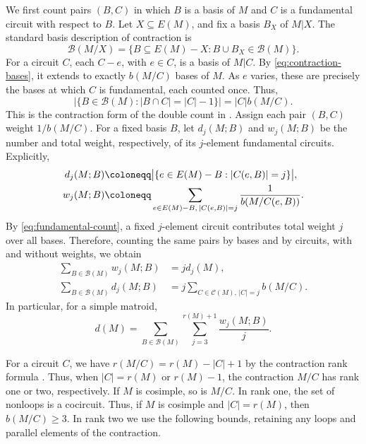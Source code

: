 \documentclass[11pt]{article}
\numberwithin{equation}{section}
\newcommand{\BB}{\mathcal B}
\newcommand{\CC}{\mathcal C}
\newcommand{\wloc}[1]{w_{#1}(M;B)}
\newcommand{\dloc}[1]{d_{#1}(M;B)}
\begin{document}
We first count pairs \((B,C)\) in which \(B\) is a basis of
\(M\) and \(C\) is a fundamental circuit with respect to \(B\).
Let \(X\subseteq E(M)\), and fix a basis \(B_X\) of \(M|X\).
The standard basis description of contraction
\cite[Corollary~3.1.8]{Oxley2011} is
\begin{equation}\label{eq:contraction-bases}
 \BB(M/X)=\{B\subseteq E(M)-X:B\cup B_X\in\BB(M)\}.
\end{equation}
For a circuit \(C\), each \(C-e\), with \(e\in C\), is a basis
of \(M|C\). By \eqref{eq:contraction-bases}, it extends to
exactly \(b(M/C)\) bases of \(M\). As \(e\) varies, these are
precisely the bases at which \(C\) is fundamental, each counted once.
Thus,
\begin{equation}\label{eq:fundamental-count}
 \bigl|\{B\in\BB(M):|B\cap C|=|C|-1\}\bigr|=|C|b(M/C).
\end{equation}
This is the contraction form of the double count in
\cite[proof of Theorem~1.1]{Oxley1983}.
Assign each pair \((B,C)\) weight \(1/b(M/C)\).
For a fixed basis \(B\), let \(\dloc{j}\) and \(\wloc{j}\)
be the number and total weight, respectively, of its
\(j\)-element fundamental circuits.
Explicitly,
\begin{align}
 \dloc{j}&\coloneqq\bigl|\{e\in E(M)-B:|C(e,B)|=j\}\bigr|,
 \notag\\
 \wloc{j}&\coloneqq\sum_{e\in E(M)-B,\,|C(e,B)|=j}
 \frac1{b(M/C(e,B))}.
 \label{eq:local-weight}
\end{align}
By \eqref{eq:fundamental-count}, a fixed \(j\)-element circuit
contributes total weight \(j\) over all bases.
Therefore, counting the same pairs by bases and by circuits,
with and without weights, we obtain
\begin{align}
 \sum_{B\in\BB(M)}\wloc{j}&=j d_j(M),
 \label{eq:weight-total}\\
 \sum_{B\in\BB(M)}\dloc{j}
 &=j\sum_{C\in\CC(M),\,|C|=j}b(M/C).
 \label{eq:count-total}
\end{align}
In particular, for a simple matroid,
\begin{equation*}
 d(M)=\sum_{B\in\BB(M)}\sum_{j=3}^{r(M)+1}\frac{\wloc{j}}j.
\end{equation*}

For a circuit \(C\), we have \(r(M/C)=r(M)-|C|+1\)
by the contraction rank formula \cite[Proposition~3.1.6]{Oxley2011}.
Thus, when \(|C|=r(M)\) or \(r(M)-1\), the contraction \(M/C\)
has rank one or two, respectively. If \(M\) is cosimple, so is
\(M/C\). In rank one, the set of nonloops is a cocircuit.
Thus, if \(M\) is cosimple and \(|C|=r(M)\), then \(b(M/C)\ge3\).
In rank two we use the following bounds, retaining any loops and
parallel elements of the contraction.
\end{document}
